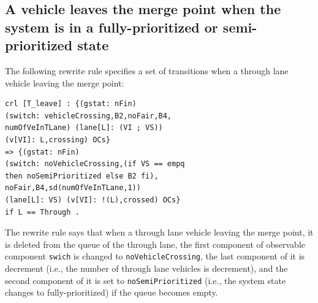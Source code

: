 \documentclass[10pt, conference, compsocconf]{IEEEtran}
\begin{document}
\subsection{A vehicle leaves the merge point when the system is in a fully-prioritized or semi-prioritized state}



The following rewrite rule specifies a set of transitions when a through lane vehicle leaving the merge point:

\begin{small}
\begin{verbatim}
crl [T_leave] : {(gstat: nFin) 
(switch: vehicleCrossing,B2,noFair,B4,
numOfVeInTLane) (lane[L]: (VI ; VS)) 
(v[VI]: L,crossing) OCs} 
=> {(gstat: nFin) 
(switch: noVehicleCrossing,(if VS == empq 
then noSemiPrioritized else B2 fi),
noFair,B4,sd(numOfVeInTLane,1)) 
(lane[L]: VS) (v[VI]: !(L),crossed) OCs} 
if L == Through .
\end{verbatim}
\end{small}

\noindent
The rewrite rule says that when a through lane vehicle leaving the merge point, it is deleted from the queue of the through lane, the first component of observable component \verb!swich! is changed to \verb!noVehicleCrossing!, the last component of it is decrement (i.e., the number of through lane vehicles is decrement), and the second component of it is set to \verb!noSemiPrioritized! (i.e., the system state changes to fully-prioritized) if the queue becomes empty.
\end{document}
